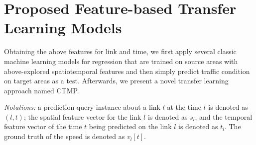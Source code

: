 \section{Proposed Feature-based Transfer Learning Models}
Obtaining the above features for link and time,
we first apply several classic machine learning models for regression that are trained on source areas with above-explored spatiotemporal features and then simply predict traffic condition on target areas as a test.
Afterwards, we present a novel transfer learning approach named CTMP.

\textit{Notations:} a prediction query instance about a link $l$ at the time $t$ is denoted as $(l,t)$; 
the spatial feature vector for the link $l$ is denoted as  $s_l$, and the temporal feature vector of the time $t$ being predicted on the link $l$ is denoted as  $t_l$.
The ground truth of the speed is denoted as $v_l[t]$.






